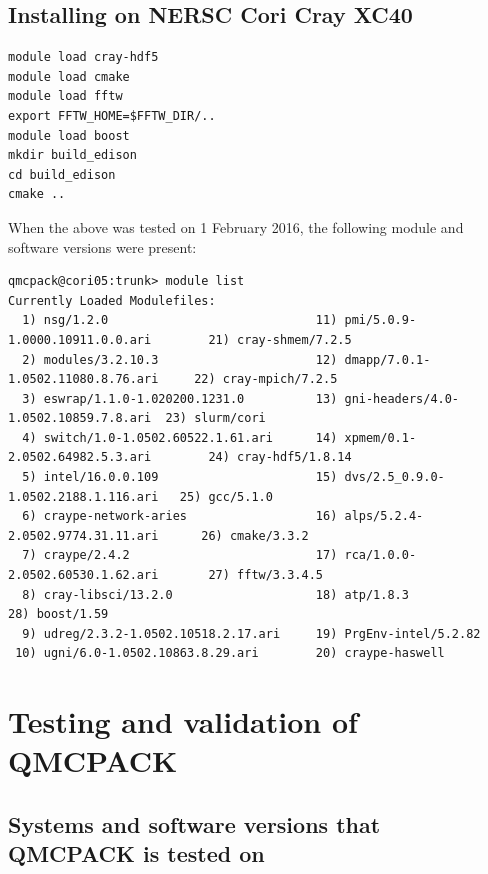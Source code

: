 \subsection{Installing on NERSC Cori Cray XC40}
\begin{verbatim}
module load cray-hdf5
module load cmake
module load fftw
export FFTW_HOME=$FFTW_DIR/..
module load boost
mkdir build_edison
cd build_edison
cmake ..
\end{verbatim}
When the above was tested on 1 February 2016, the following module and
software versions were present:
\begin{verbatim}
qmcpack@cori05:trunk> module list
Currently Loaded Modulefiles:
  1) nsg/1.2.0                             11) pmi/5.0.9-1.0000.10911.0.0.ari        21) cray-shmem/7.2.5
  2) modules/3.2.10.3                      12) dmapp/7.0.1-1.0502.11080.8.76.ari     22) cray-mpich/7.2.5
  3) eswrap/1.1.0-1.020200.1231.0          13) gni-headers/4.0-1.0502.10859.7.8.ari  23) slurm/cori
  4) switch/1.0-1.0502.60522.1.61.ari      14) xpmem/0.1-2.0502.64982.5.3.ari        24) cray-hdf5/1.8.14
  5) intel/16.0.0.109                      15) dvs/2.5_0.9.0-1.0502.2188.1.116.ari   25) gcc/5.1.0
  6) craype-network-aries                  16) alps/5.2.4-2.0502.9774.31.11.ari      26) cmake/3.3.2
  7) craype/2.4.2                          17) rca/1.0.0-2.0502.60530.1.62.ari       27) fftw/3.3.4.5
  8) cray-libsci/13.2.0                    18) atp/1.8.3                             28) boost/1.59
  9) udreg/2.3.2-1.0502.10518.2.17.ari     19) PrgEnv-intel/5.2.82
 10) ugni/6.0-1.0502.10863.8.29.ari        20) craype-haswell
\end{verbatim}

\section{Testing and validation of QMCPACK}
\label{sec:testing}
\subsection{Systems and software versions that QMCPACK is tested on}

